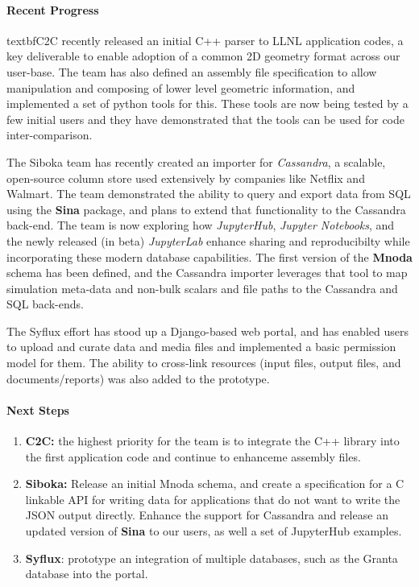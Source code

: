 \paragraph{Recent Progress}

textbf{C2C} recently released an initial C++ parser to LLNL application codes,
a key deliverable to enable adoption of a common 2D geometry format across our
user-base. The team has also defined an assembly file specification to allow
manipulation and composing of lower level geometric information, and
implemented a set of python tools for this. These tools are now being tested by
a few initial users and they have demonstrated that the tools can be used for
code inter-comparison.

The Siboka team has recently created an importer for \textit{Cassandra}, a
scalable, open-source column store used extensively by companies like Netflix
and Walmart. The team demonstrated the ability to
query and export data from SQL using the \textbf{Sina} package, and plans to
extend that functionality to the Cassandra back-end. The team is now exploring
how \textit{JupyterHub}, \textit{Jupyter Notebooks}, and the newly released (in
beta) \textit{JupyterLab} enhance sharing and reproducibilty while
incorporating these modern database capabilities.  The first version of the
\textbf{Mnoda} schema has been defined, and the Cassandra importer leverages
that tool to map simulation meta-data and non-bulk scalars and file paths to
the Cassandra and SQL back-ends.

The Syflux effort has stood up a Django-based web portal, and has enabled users
to upload and curate data and media files and implemented a basic permission
model for them.  The ability to cross-link resources (input files, output
files, and documents/reports) was also added to the prototype.

\paragraph{Next Steps}
\begin{enumerate}
\item \textbf{C2C:} the highest priority for the team is to integrate the C++
	library into the first application code and continue to enhanceme 
	assembly files. 
\item \textbf{Siboka:} Release an initial Mnoda schema, and create a specification for a C linkable API for writing data for applications that do not want to write the JSON output directly. Enhance the support for Cassandra and release an updated version of \textbf{Sina} to our users, as well a set of JupyterHub examples.
\item \textbf{Syflux}: prototype an integration of multiple databases, such as
	the Granta database into the portal.

\end{enumerate}
